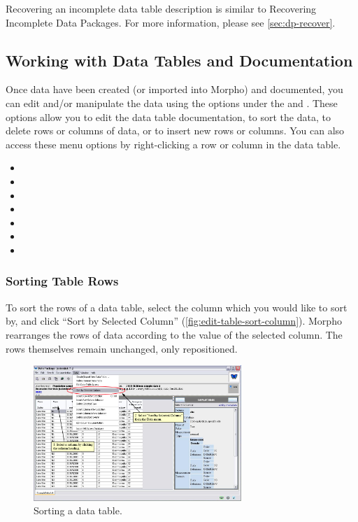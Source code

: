 Recovering an incomplete data table description is similar to Recovering
Incomplete Data Packages. For more information, please see
\autoref{sec:dp-recover}.

\subsection{Working with Data Tables and Documentation}
\label{sec:working-with-data}

Once data have been created (or imported into Morpho) and documented,
you can edit and/or manipulate the data using the options under the
 and . These options allow
you to edit the data table documentation, to sort the data, to delete
rows or columns of data, or to insert new rows or columns. You can also
access these menu options by right-clicking a row or column in the data
table.

\begin{itemize}
  \setlength{\parskip}{1pt}
  \item {}
  \item {}
  \item {}
  \item {}
  \item {}
  \item {}
  \item {}
\end{itemize}

\subsubsection{Sorting Table Rows}
\label{sec:edit-table-sort}

To sort the rows of a data table, select the column which you would like
to sort by, and click ``Sort by Selected Column''
(\autoref{fig:edit-table-sort-column}). Morpho rearranges the rows of
data according to the value of the selected column. The rows themselves
remain unchanged, only repositioned.

\begin{figure}
  \centering
    \includegraphics[width=0.7\textwidth]{images/edit-table-sort-column.jpg}
  \caption{Sorting a data table.}
  \label{fig:edit-table-sort-column}
\end{figure}

